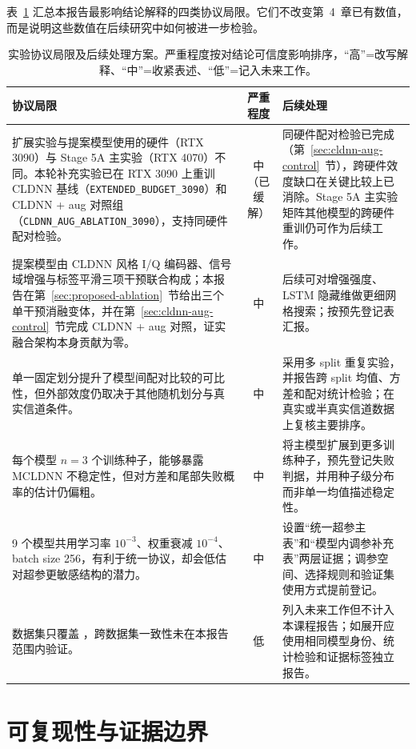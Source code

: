 表~\ref{tab:protocol-limitations-next} 汇总本报告最影响结论解释的四类协议局限。它们不改变第~4~章已有数值，而是说明这些数值在后续研究中如何被进一步检验。

\begin{table}[htbp]
  \centering
  \caption{实验协议局限及后续处理方案。严重程度按对结论可信度影响排序，``高''=改写解释、``中''=收紧表述、``低''=记入未来工作。}
  \label{tab:protocol-limitations-next}
  \scriptsize
  \setlength{\tabcolsep}{4pt}
  \begin{tabularx}{\textwidth}{p{}cX}
    \toprule
    协议局限 & 严重程度 & 后续处理 \\
    \midrule
    扩展实验与提案模型使用的硬件（RTX 3090）与 Stage 5A 主实验（RTX 4070）不同。本轮补充实验已在 RTX 3090 上重训 CLDNN 基线（\texttt{EXTENDED\_BUDGET\_3090}）和 CLDNN + aug 对照组（\texttt{CLDNN\_AUG\_ABLATION\_3090}），支持同硬件配对检验。 & 中（已缓解） & 同硬件配对检验已完成（第~\ref{sec:cldnn-aug-control}~节），跨硬件效度缺口在关键比较上已消除。Stage 5A 主实验矩阵其他模型的跨硬件重训仍可作为后续工作。 \\
    提案模型由 CLDNN 风格 I/Q 编码器、信号域增强与标签平滑三项干预联合构成；本报告在第~\ref{sec:proposed-ablation}~节给出三个单干预消融变体，并在第~\ref{sec:cldnn-aug-control}~节完成 CLDNN + aug 对照，证实融合架构本身贡献为零。 & 中 & 后续可对增强强度、LSTM 隐藏维做更细网格搜索；按预先登记表汇报。 \\
    单一固定划分提升了模型间配对比较的可比性，但外部效度仍取决于其他随机划分与真实信道条件。 & 中 & 采用多 split 重复实验，并报告跨 split 均值、方差和配对统计检验；在真实或半真实信道数据上复核主要排序。 \\
    每个模型 \(n=3\) 个训练种子，能够暴露 MCLDNN 不稳定性，但对方差和尾部失败概率的估计仍偏粗。 & 中 & 将主模型扩展到更多训练种子，预先登记失败判据，并用种子级分布而非单一均值描述稳定性。 \\
    9 个模型共用学习率 \(10^{-3}\)、权重衰减 \(10^{-4}\)、batch size 256，有利于统一协议，却会低估对超参更敏感结构的潜力。 & 中 & 设置“统一超参主表”和“模型内调参补充表”两层证据；调参空间、选择规则和验证集使用方式提前登记。 \\
    数据集只覆盖 \datasetname{}，跨数据集一致性未在本报告范围内验证。 & 低 & 列入未来工作但不计入本课程报告；如展开应使用相同模型身份、统计检验和证据标签独立报告。 \\
    \bottomrule
  \end{tabularx}
\end{table}

\section{可复现性与证据边界}

